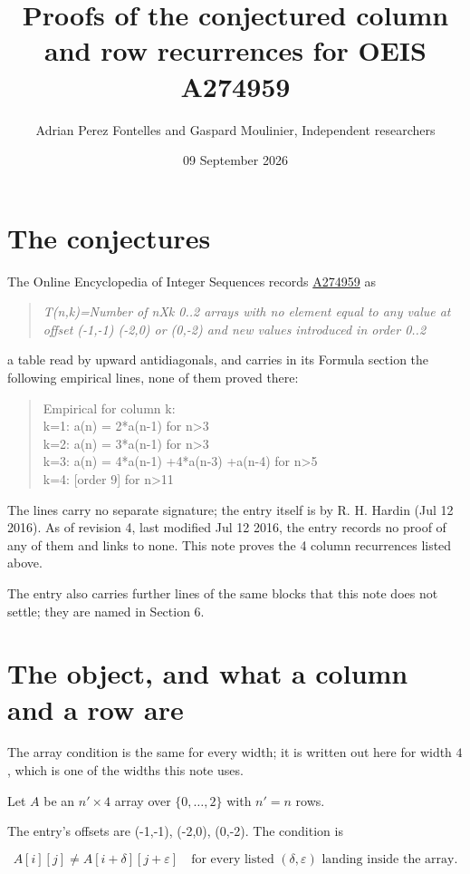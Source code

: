 \documentclass[11pt]{article}
\title{Proofs of the conjectured column and row recurrences for OEIS A274959}
\author{Adrian Perez Fontelles and Gaspard Moulinier, Independent researchers}
\date{09 September 2026}
\theoremstyle{definition}
\begin{document}
\maketitle
\section{The conjectures}

The Online Encyclopedia of Integer Sequences records \href{https://oeis.org/A274959}{A274959} as

\begin{quote}\itshape T(n,k)=Number of nXk 0..2 arrays with no element equal to any value at offset (-1,-1) (-2,0) or (0,-2) and new values introduced in order 0..2\end{quote}

a table read by upward antidiagonals, and carries in its Formula section the following empirical lines, none of them proved there:

\begin{quote}\ttfamily Empirical for column k:\\
k=1: a(n) = 2*a(n-1) for n>3\\k=2: a(n) = 3*a(n-1) for n>3\\k=3: a(n) = 4*a(n-1) +4*a(n-3) +a(n-4) for n>5\\k=4: [order 9] for n>11\end{quote}

The lines carry no separate signature; the entry itself is by R. H. Hardin (Jul 12 2016). As of revision 4, last modified Jul 12 2016, the entry records no proof of any of them and links to none. This note proves the 4 column recurrences listed above.

The entry also carries further lines of the same blocks that this note does not settle; they are named in Section 6.

\section{The object, and what a column and a row are}

The array condition is the same for every width; it is written out here for width $4$, which is one of the widths this note uses.

Let $A$ be an $n' \times 4$ array over $\{0,\dots,2\}$ with $n' = n$ rows.

The entry's offsets are (-1,-1), (-2,0), (0,-2). The condition is

\[A[i][j] \ne A[i{+}\delta][j{+}\varepsilon]\quad\text{for every listed }(\delta,\varepsilon)\text{ landing inside the array.}\]
\end{document}
